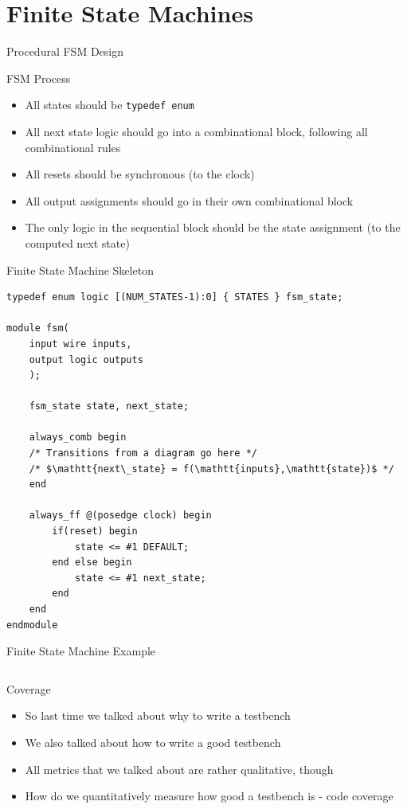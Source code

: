 \documentclass[dvipsnames]{beamer}
\begin{document}
\section{Finite State Machines}
\begin{frame}{Procedural FSM Design}
	\begin{block}{FSM Process}
		\begin{itemize}
			\item All states should be \texttt{typedef enum}
			\item All next state logic should go into a combinational block,
				following all combinational rules
			\item All resets should be synchronous (to the clock)
			\item All output assignments should go in their own combinational
				block
			\item The only logic in the sequential block should be the state
				assignment (to the computed next state)
		\end{itemize}
	\end{block}
\end{frame}

\begin{frame}[fragile]{Finite State Machine Skeleton}
	\vspace*{-12pt}
	\begin{verbatim}
typedef enum logic [(NUM_STATES-1):0] { STATES } fsm_state;

module fsm(
    input wire inputs,
    output logic outputs
    );

    fsm_state state, next_state;

    always_comb begin
    /* Transitions from a diagram go here */
    /* $\mathtt{next\_state} = f(\mathtt{inputs},\mathtt{state})$ */
    end

    always_ff @(posedge clock) begin
        if(reset) begin
            state <= #1 DEFAULT;
        end else begin
            state <= #1 next_state;
        end
    end
endmodule
	\end{verbatim}
\end{frame}

\begin{frame}{Finite State Machine Example}
	\vspace*{-12pt}
	\inputminted[frame=lines,fontsize=\scriptsize,tabsize=4,obeytabs=true]{systemverilog}{verilog/fsm.v}
\end{frame}
\begin{frame}{Coverage}
    \begin{itemize}
        \item So last time we talked about why to write a testbench
        \item We also talked about how to write a good testbench
        \item All metrics that we talked about are rather qualitative, though
        \item How do we quantitatively measure how good a testbench is - code coverage
    \end{itemize}
\end{frame}
\end{document}

